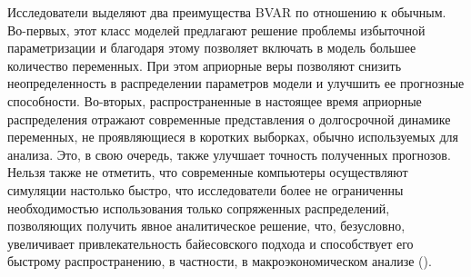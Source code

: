 \documentclass[11pt]{article} %
\begin{document}
 Исследователи выделяют два преимущества BVAR по отношению к обычным. Во-первых, этот класс моделей предлагают решение проблемы избыточной параметризации и благодаря этому позволяет включать в модель большее количество переменных. При этом априорные веры позволяют снизить неопределенность в распределении параметров модели и улучшить ее прогнозные способности. Во-вторых, распространенные в настоящее время  априорные распределения отражают современные представления о  долгосрочной динамике переменных, не проявляющиеся в коротких выборках, обычно используемых для анализа. Это, в свою очередь, также улучшает точность полученных прогнозов. Нельзя также не отметить, что современные компьютеры осуществляют симуляции настолько быстро, что исследователи более не ограниченны необходимостью использования только сопряженных распределений, позволяющих получить явное аналитическое решение, что, безусловно, увеличивает привлекательность байесовского подхода и способствует его быстрому распространению, в частности, в макроэкономическом анализе (\cite{karlsson_2012}). 
\end{document}
